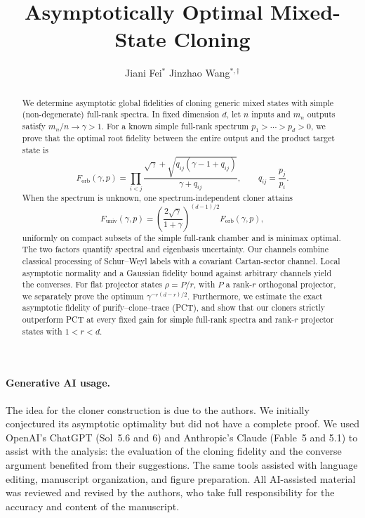 \documentclass[11pt]{article}
\title{Asymptotically Optimal Mixed-State Cloning}
\author{Jiani Fei\(^{*}\)\qquad
  Jinzhao Wang\(^{*,\dagger}\)}
\date{}
\theoremstyle{remark}
\theoremstyle{plain}
\newcommand{\Forb}{F_{\mathrm{orb}}}
\newcommand{\Funiv}{F_{\mathrm{univ}}}
\begin{document}
\maketitle
\begingroup
\renewcommand{\thefootnote}{\fnsymbol{footnote}}
\endgroup

\begin{abstract}
We determine asymptotic global fidelities of cloning generic
mixed states with simple (non-degenerate) full-rank spectra. In fixed dimension $d$, let $n$ inputs and
$m_n$ outputs satisfy $m_n/n\to\gamma>1$.  For a known simple
full-rank spectrum $p_1>\cdots>p_d>0$, we prove that the optimal root
fidelity between the entire output and the product target state is
$$
  \Forb(\gamma,p)
  =\prod_{i<j}
  \frac{\sqrt{\gamma}+\sqrt{q_{ij}(\gamma-1+q_{ij})}}
       {\gamma+q_{ij}},
  \qquad q_{ij}=\frac{p_j}{p_i}.
$$
When the spectrum is unknown, one spectrum-independent cloner attains
$$
  \Funiv(\gamma,p)
  =\left(\frac{2\sqrt\gamma}{1+\gamma}\right)^{(d-1)/2}
   \Forb(\gamma,p),
$$
uniformly on compact subsets of the simple full-rank chamber and is minimax optimal.  The two factors quantify
spectral and eigenbasis uncertainty.  Our channels combine classical
processing of Schur--Weyl labels with a covariant Cartan-sector channel.
Local asymptotic normality and a Gaussian fidelity bound against arbitrary
channels yield the converses.  For flat projector states $\rho=P/r$,
with $P$ a rank-$r$ orthogonal projector, we separately prove the
optimum $\gamma^{-r(d-r)/2}$.  Furthermore, we estimate the exact asymptotic fidelity
of purify--clone--trace (PCT), and show that our cloners strictly
outperform PCT at every fixed gain for simple full-rank spectra and
rank-$r$ projector states with $1<r<d$.
\end{abstract}

\vspace{3em}
\begin{samepage}
\paragraph{Generative AI usage.}
The idea for the cloner construction is due to the authors. We
initially conjectured its asymptotic optimality but did not have a complete
proof.  We used OpenAI's ChatGPT (Sol~5.6 and 6) and Anthropic's Claude
(Fable~5 and 5.1) to assist with the analysis: the evaluation of the
cloning fidelity and the converse argument benefited from their
suggestions.  The same tools assisted with language editing, manuscript
organization, and figure preparation.  All AI-assisted material was
reviewed and revised by the authors, who take full responsibility for the
accuracy and content of the manuscript.
\end{samepage}
\end{document}
